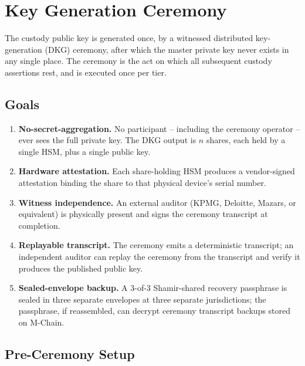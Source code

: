 \section{Key Generation Ceremony}

\label{sec:ceremony}

The custody public key is generated once, by a witnessed distributed
key-generation (DKG) ceremony, after which the master private key
never exists in any single place. The ceremony is the act on which
all subsequent custody assertions rest, and is executed once per tier.

\subsection{Goals}

\begin{enumerate}[nosep]
\item \textbf{No-secret-aggregation.} No participant -- including the
ceremony operator -- ever sees the full private key. The DKG output
is $n$ shares, each held by a single HSM, plus a single public key.
\item \textbf{Hardware attestation.} Each share-holding HSM produces
a vendor-signed attestation binding the share to that physical
device's serial number.
\item \textbf{Witness independence.} An external auditor (KPMG,
Deloitte, Mazars, or equivalent) is physically present and signs
the ceremony transcript at completion.
\item \textbf{Replayable transcript.} The ceremony emits a
deterministic transcript; an independent auditor can replay the
ceremony from the transcript and verify it produces the published
public key.
\item \textbf{Sealed-envelope backup.} A 3-of-3 Shamir-shared
recovery passphrase is sealed in three separate envelopes at three
separate jurisdictions; the passphrase, if reassembled, can decrypt
ceremony transcript backups stored on M-Chain.
\end{enumerate}

\subsection{Pre-Ceremony Setup}

